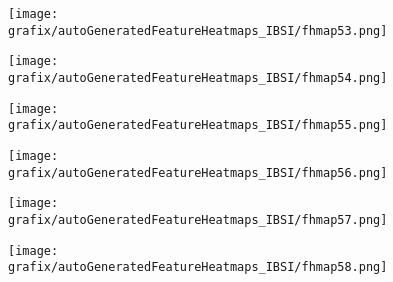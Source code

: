 \hspace{\hsp} 
\begin{subfigure}{\wid\textwidth} 
    \centering 
    \caption{\tiny \sffamily {}} 
    \vspace{\vsp} 
    \texttt{[image: grafix/autoGeneratedFeatureHeatmaps\_IBSI/fhmap53.png]} 
\end{subfigure} 
\hspace{\hsp} 
\begin{subfigure}{\wid\textwidth} 
    \centering 
    \caption{\tiny \sffamily {}} 
    \vspace{\vsp} 
    \texttt{[image: grafix/autoGeneratedFeatureHeatmaps\_IBSI/fhmap54.png]} 
\end{subfigure} 
\hspace{\hsp} 
\begin{subfigure}{\wid\textwidth} 
    \centering 
    \caption{\tiny \sffamily {}} 
    \vspace{\vsp} 
    \texttt{[image: grafix/autoGeneratedFeatureHeatmaps\_IBSI/fhmap55.png]} 
\end{subfigure} 
\hspace{\hsp} 
\begin{subfigure}{\wid\textwidth} 
    \centering 
    \caption{\tiny \sffamily {}} 
    \vspace{\vsp} 
    \texttt{[image: grafix/autoGeneratedFeatureHeatmaps\_IBSI/fhmap56.png]} 
\end{subfigure} 
\hspace{\hsp} 
\begin{subfigure}{\wid\textwidth} 
    \centering 
    \caption{\tiny \sffamily {}} 
    \vspace{\vsp} 
    \texttt{[image: grafix/autoGeneratedFeatureHeatmaps\_IBSI/fhmap57.png]} 
\end{subfigure} 
\hspace{\hsp} 
\begin{subfigure}{\wid\textwidth} 
    \centering 
    \caption{\tiny \sffamily {}} 
    \vspace{\vsp} 
    \texttt{[image: grafix/autoGeneratedFeatureHeatmaps\_IBSI/fhmap58.png]} 
\end{subfigure} 
\hspace{\hsp} 
